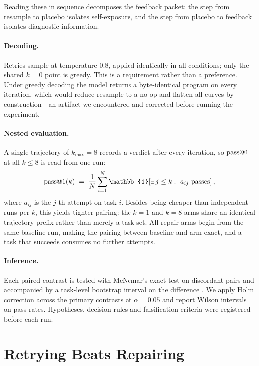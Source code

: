 Reading these in sequence decomposes the feedback packet: the step from
\textsf{resample} to \textsf{placebo} isolates self-exposure, and the step from
\textsf{placebo} to \textsf{feedback} isolates diagnostic information.

\paragraph{Decoding.}
Retries sample at temperature $0.8$, applied identically in all conditions;
only the shared $k{=}0$ point is greedy. This is a requirement rather than a
preference. Under greedy decoding the model returns a byte-identical program on
every iteration, which would reduce \textsf{resample} to a no-op and flatten
all curves by construction---an artifact we encountered and corrected before
running the experiment.

\paragraph{Nested evaluation.}
A single trajectory of $k_{\max}{=}8$ records a verdict after every iteration,
so $\mathrm{pass}@1$ at all $k \le 8$ is read from one run:
\begin{equation}
\pass(k) \;=\; \frac{1}{N}\sum_{i=1}^{N}
  \mathbb{1}\!\left[\exists\, j \le k :\ a_{ij} \text{ passes}\right],
\end{equation}
where $a_{ij}$ is the $j$-th attempt on task $i$. Besides being cheaper than
independent runs per $k$, this yields tighter pairing: the $k{=}1$ and $k{=}8$
arms share an identical trajectory prefix rather than merely a task set. All
repair arms begin from the same baseline run, making the pairing between
baseline and arm exact, and a task that succeeds consumes no further attempts.

\paragraph{Inference.}
Each paired contrast is tested with McNemar's exact test on discordant pairs
\cite{mcnemar1947} and accompanied by a task-level bootstrap interval on the
difference \cite{efron1979bootstrap}. We apply Holm correction
\cite{holm1979} across the primary contrasts at $\alpha{=}0.05$ and report
Wilson intervals \cite{wilson1927} on pass rates. Hypotheses, decision rules
and falsification criteria were registered before each run.

\section{Retrying Beats Repairing}
\label{sec:repair}

